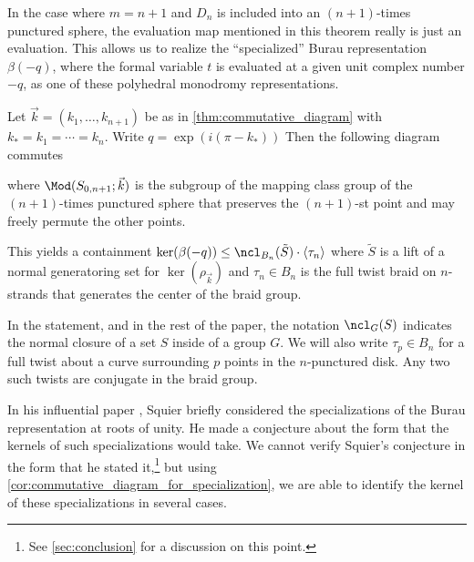 \documentclass{amsart}
\begin{document}
    In the case where $m=n+1$ and $D_n$ is included into an $(n+1)$-times punctured sphere, the evaluation map mentioned in this theorem really is just an evaluation. This allows us to realize the ``specialized'' Burau representation $\beta(-q)$, where the formal variable $t$ is evaluated at a given unit complex number $-q$, as one of these polyhedral monodromy representations.
    \begin{corollary}\label{cor:commutative_diagram_for_specialization}
        Let $\vec k = (k_1,\dotsc,k_{n+1})$ be as in \cref{thm:commutative_diagram} with $k_*=k_1=\dotsb=k_n$. Write $q=\exp(i(\pi-k_*))$ Then the following diagram commutes
        \begin{center}
        \end{center}
        where $\Mod(S_{0,n+1};\vec k)$ is the subgroup of the mapping class group of the $(n+1)$-times punctured sphere that preserves the $(n+1)$-st point and may freely permute the other points.
        
        This yields a containment $\ker(\beta(-q)) \leq \ncl_{B_n}(\tilde S) \cdot \langle \tau_n \rangle$ where $\tilde S$ is a lift of a normal generatoring set for $\ker (\rho_{\vec k})$ and $\tau_n \in B_n$ is the full twist braid on $n$-strands that generates the center of the braid group.
    \end{corollary}

    In the statement, and in the rest of the paper, the notation $\ncl_G(S)$ indicates the normal closure of a set $S$ inside of a group $G$. We will also write $\tau_p \in B_n$ for a full twist about a curve surrounding $p$ points in the $n$-punctured disk. Any two such twists are conjugate in the braid group.
    
    In his influential paper \cite{Squier1984TheUnitary}, Squier briefly considered the specializations of the Burau representation at roots of unity. He made a conjecture about the form that the kernels of such specializations would take. We cannot verify Squier's conjecture in the form that he stated it,\footnote{See \cref{sec:conclusion} for a discussion on this point.} but using \cref{cor:commutative_diagram_for_specialization}, we are able to identify the kernel of these specializations in several cases.
    
\end{document}
